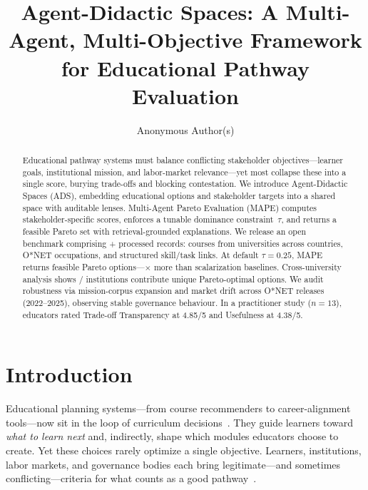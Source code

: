 \documentclass[sigconf,review]{acmart}
\title{Agent-Didactic Spaces: A Multi-Agent, Multi-Objective Framework for Educational Pathway Evaluation}
\author{Anonymous Author(s)}
\affiliation{%
  \institution{Anonymous Institution}
  \city{Anonymous City}
  \country{Anonymous Country}
}
\newcommand{\ADS}{\textsc{ADS}\xspace}
\newcommand{\MAPE}{\textsc{MAPE}\xspace}
\begin{document}
\begin{abstract}
Educational pathway systems must balance conflicting stakeholder objectives---learner goals, institutional mission, and labor-market relevance---yet most collapse these into a single score, burying trade-offs and blocking contestation.
We introduce Agent-Didactic Spaces (\ADS), embedding educational options and stakeholder targets into a shared space with auditable lenses. Multi-Agent Pareto Evaluation (\MAPE) computes stakeholder-specific scores, enforces a tunable dominance constraint~$\tau$, and returns a feasible Pareto set with retrieval-grounded explanations.
We release an open benchmark comprising {\HeadlineRecords}+ processed records: {\NumCourses} courses from {\NumUniversities} universities across {\NumCountries} countries, {\NumOccupations} O*NET occupations, and {\NumAttributeRecords} structured skill/task links.
At default $\tau{=}0.25$, \MAPE returns {\MainParetoSize} feasible Pareto options---{\ParetoVsBaselineRatio}$\times$ more than scalarization baselines. Cross-university analysis shows {\NumUnisContributing}/{\NumUniversities} institutions contribute unique Pareto-optimal options. We audit robustness via mission-corpus expansion and market drift across O*NET releases (2022--2025), observing stable governance behaviour. In a practitioner study ($n{=}13$), educators rated Trade-off Transparency at 4.85/5 and Usefulness at 4.38/5.
\end{abstract}

\maketitle


\section{Introduction}

Educational planning systems---from course recommenders to career-alignment tools---now sit in the loop of curriculum decisions~\cite{dasilva2022slrERS,aucancela2023ersslr}. They guide learners toward \emph{what to learn next} and, indirectly, shape which modules educators choose to create. Yet these choices rarely optimize a single objective. Learners, institutions, labor markets, and governance bodies each bring legitimate---and sometimes conflicting---criteria for what counts as a good pathway~\cite{abdollahpouri2020multistakeholder}.
\end{document}
